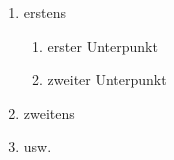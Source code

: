 \documentclass{article}
\begin{document}
\begin{enumerate}
\item erstens
\begin{enumerate}
\item erster Unterpunkt
\item zweiter Unterpunkt
\end{enumerate}
\item zweitens
\item usw.
\end{enumerate}
\end{document}
